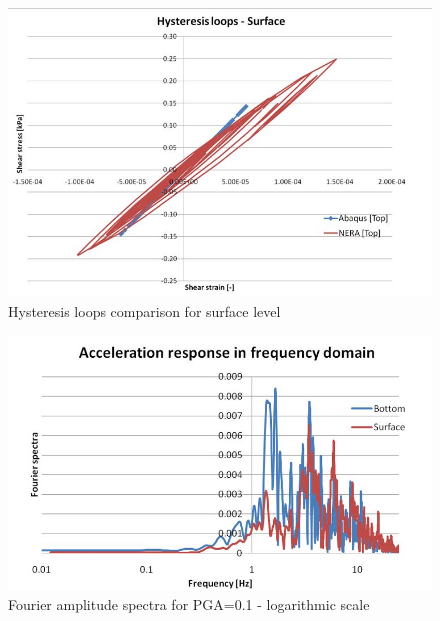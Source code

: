\documentclass[10pt,a4paper]{report}
\begin{document}
\begin{figure}[h!]
	\centering
	\includegraphics[width=0.7\linewidth]{"hysteresis_low_surf"}
	\caption{Hysteresis loops comparison for surface level}
	\label{hyst_top}
\end{figure}

\begin{figure}[h!]
	\centering
	\includegraphics[width=0.7\linewidth]{"spectral_low"}
	\caption{Fourier amplitude spectra for PGA=0.1 - logarithmic scale}
	\label{fourier3}
\end{figure}
\end{document}
